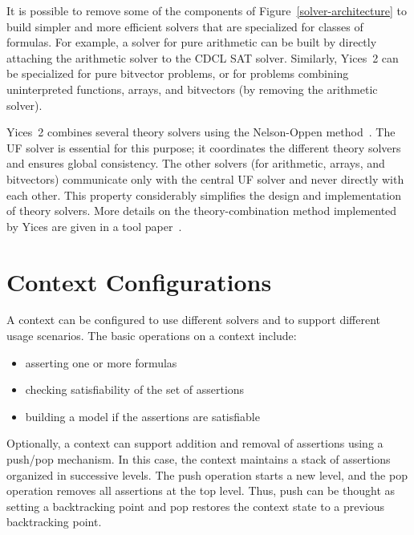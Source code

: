 \documentclass[11pt,twoside,fleqn,openright,titlepage]{cslreport}
\begin{document}
It   is    possible   to   remove   some   of    the   components   of
Figure~\ref{solver-architecture} to  build simpler and  more efficient
solvers that are specialized for  classes of formulas.  For example, a
solver  for pure  arithmetic can  be built  by directly  attaching the
arithmetic solver to  the CDCL SAT solver.  Similarly,  Yices~2 can be
specialized  for pure  bitvector problems,  or for  problems combining
uninterpreted  functions,  arrays,  and  bitvectors (by  removing  the
arithmetic solver).

Yices~2 combines several theory solvers using the Nelson-Oppen
method~\cite{NelsonOppen79}.  The UF solver is essential for this
purpose; it coordinates the different theory solvers and ensures
global consistency. The other solvers (for arithmetic, arrays, and
bitvectors) communicate only with the central UF solver and never
directly with each other.  This property considerably simplifies the
design and implementation of theory solvers.  More details on the
theory-combination method implemented by Yices are given in a tool
paper~\cite{Dutertre:cav2014}.


\section{Context Configurations}
\label{features}

A context can be configured to use different solvers and to support
different usage scenarios. The basic operations on a context
include:
\begin{itemize}
\item asserting one or more formulas
\item checking satisfiability of the set of assertions
\item building a model if the assertions are satisfiable
\end{itemize}
Optionally, a context can support addition and removal of assertions
using a push/pop mechanism.  In this case, the context maintains a
stack of assertions organized in successive levels.  The push
operation starts a new level, and the pop operation removes all
assertions at the top level.  Thus, push can be thought as setting a
backtracking point and pop restores the context state to a previous
backtracking point.
\end{document}
